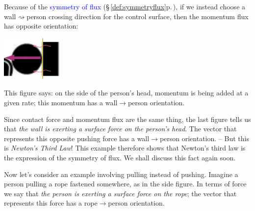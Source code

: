 \documentclass[a4paper,12pt,%
onecolumn,oneside,%
british%
]{memoir}
\renewcommand*{\|}[1][]{\nonscript\:#1\vert\nonscript\:\mathopen{}}
\newcommand*{\sect}{\S}%
\renewcommand*{\autoref}[3][\sect\,\ref]{\textcolor{blue}{#3} {\color{blue}\scriptsize(\faIcon[regular]{eye}\;#1{#2}\;p.\,\pageref{#2})}}
\begin{document}
Because of the \autoref{def:symmetryflux}{symmetry of flux}, if we instead choose a wall$\rightsquigarrow$person crossing direction for the control surface, then the momentum flux has opposite orientation:\noprelistbreak
\begin{center}
  \includegraphics[height=6em]{images/person_push_flux_left.pdf}
\end{center}
This figure says: on the side of the person's head, momentum is being added at a given rate; this momentum has a wall$\rightarrow$person orientation.

Since contact force and momentum flux are the same thing, the last figure tells us that \emph{the wall is exerting a surface force on the person's head}. The vector that represents this opposite pushing force has a wall$\to$person orientation. -- But this is \emph{Newton's Third Law}! This example therefore shows that Newton's third law is the expression of the symmetry of flux. We shall discuss this fact again soon.

\medskip

Now let's consider an example involving pulling instead of pushing. Imagine a person pulling a rope fastened somewhere, as in the side figure. In terms of force we say that \emph{the person is exerting a surface force on the rope}; the vector that represents this force has a rope$\rightarrow$person orientation.
%
%
\end{document}
